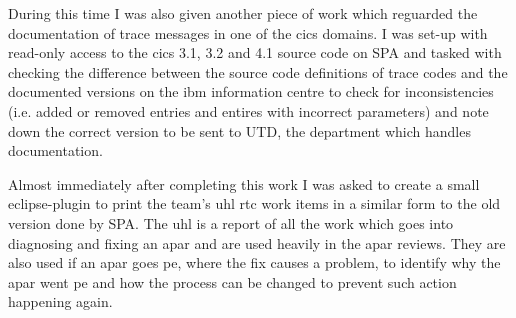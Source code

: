 \documentclass[a4paper,11pt]{report}
\begin{document}
During this time I was also given another piece of work which reguarded the documentation of trace
messages in one of the \gls{cics} domains. I was set-up with read-only access to the \gls{cics} 
3.1, 3.2 and 4.1 source code on SPA and tasked with checking the difference between the source code
definitions of trace codes and the documented versions on the \gls{ibm} information centre to check
for inconsistencies (i.e. added or removed entries and entires with incorrect parameters) and note
down the correct version to be sent to UTD, the department which handles documentation.

Almost immediately after completing this work I was asked to create a small eclipse-plugin to print
the team's \gls{uhl} \gls{rtc} work items in a similar form to the old version done by SPA. The 
\gls{uhl} is a report of all the work which goes into diagnosing and fixing an \gls{apar} and are
used heavily in the \gls{apar} reviews. They are also used if an \gls{apar} goes \gls{pe}, where
the fix causes a problem, to identify why the \gls{apar} went \gls{pe} and how the process can be
changed to prevent such action happening again.
\end{document}
